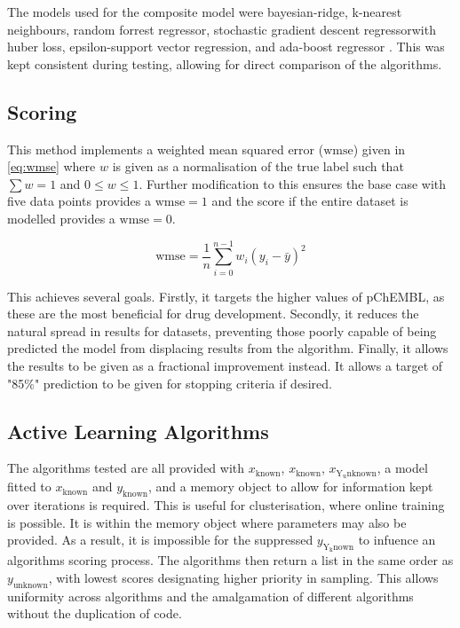 The models used for the composite model were bayesian-ridge, k-nearest neighbours, random forrest regressor, stochastic gradient descent regressorwith huber loss, epsilon-support vector regression, and ada-boost regressor \cite{scikit}. This was kept consistent during testing, allowing for direct comparison of the algorithms.

\subsection{Scoring}
This method implements a weighted mean squared error ($\mathrm{wmse}$) given in \ref{eq:wmse} where $w$ is given as a normalisation of the true label such that $\sum{w}=1$ and ${0\leq{}w\leq{}1}$. Further modification to this ensures the base case with five data points provides a $\mathrm{wmse}=1$ and the score if the entire dataset is modelled provides a $\mathrm{wmse}=0$.

\begin{equation}
  \mathrm{wmse}=\frac{1}{n}\sum_{i=0}^{n-1}{w_i(y_i-\bar{y})^2}
  \label{eq:wmse}
\end{equation}

This achieves several goals. Firstly, it targets the higher values of pChEMBL, as these are the most beneficial for drug development. Secondly, it reduces the natural spread in results for datasets, preventing those poorly capable of being predicted the model from displacing results from the algorithm. Finally, it allows the results to be given as a fractional improvement instead. It allows a target of "85\%" prediction to be given for stopping criteria if desired.

\subsection{Active Learning Algorithms}
The algorithms tested are all provided with $x_\mathrm{known}$, $x_\mathrm{known}$, $x_\mathrm{Y_unknown}$, a model fitted to $x_\mathrm{known}$ and $y_\mathrm{known}$, and a memory object to allow for information kept over iterations is required. This is useful for clusterisation, where online training is possible. It is within the memory object where parameters may also be provided. As a result, it is impossible for the suppressed $y_\mathrm{Y_known}$ to infuence an algorithms scoring process. The algorithms then return a list in the same order as $y_\mathrm{unknown}$, with lowest scores designating higher priority in sampling. This allows uniformity across algorithms and the amalgamation of different algorithms without the duplication of code.

